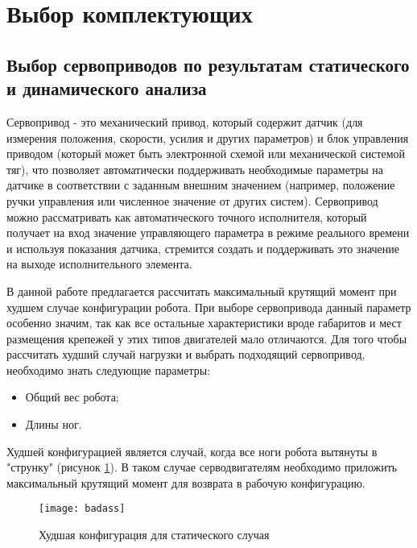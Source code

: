 \section{Выбор комплектующих}\label{C4_4}
	\subsection{Выбор сервоприводов по результатам статического и динамического анализа}\label{C4_4_1}
	
Сервопривод - это механический привод, который содержит датчик (для измерения положения, скорости, усилия и других параметров) и блок управления приводом (который может быть электронной схемой или механической системой тяг), что позволяет автоматически поддерживать необходимые параметры на датчике в соответствии с заданным внешним значением (например, положение ручки управления или численное значение от других систем). Сервопривод можно рассматривать как автоматического точного исполнителя, который получает на вход значение управляющего параметра в режиме реального времени и используя показания датчика, стремится создать и поддерживать это значение на выходе исполнительного элемента. 

В данной работе предлагается рассчитать максимальный крутящий момент при худшем случае конфигурации робота. При выборе сервопривода данный параметр особенно значим, так как все остальные характеристики вроде габаритов и мест размещения крепежей у этих типов двигателей мало отличаются. Для того чтобы рассчитать худший случай нагрузки и выбрать подходящий сервопривод, необходимо знать следующие параметры:
\begin{itemize}
	\item Общий вес робота;
	\item Длины ног.
\end{itemize}

Худшей конфигурацией является случай, когда все ноги робота вытянуты в "струнку" (рисунок \ref{badass}). В таком случае серводвигателям необходимо приложить максимальный крутящий момент для возврата в рабочую конфигурацию.

\begin{figure}[h!]
	\begin{center}
		\texttt{[image: badass]}
		\caption{{Худшая конфигурация для статического случая}}
		\label{badass}
	\end{center}
\end{figure}


